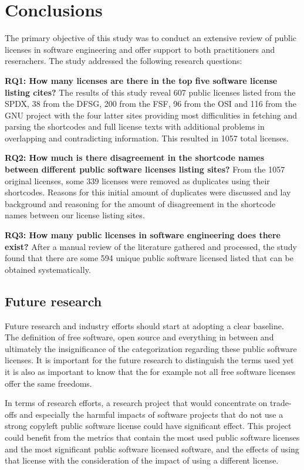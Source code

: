 \chapter{Conclusions\label{conclusions}}
The primary objective of this study was to conduct an extensive review of public licenses in software engineering and offer support to both practitioners and reserachers. The study addressed the following research questions:

\textbf{RQ1: How many licenses are there in the top five software license listing cites?} The results of this study reveal 607 public licenses listed from the SPDX, 38 from the DFSG, 200 from the FSF, 96 from the OSI and 116 from the GNU project with the four latter sites providing most difficulities in fetching and parsing the shortcodes and full license texts with additional problems in overlapping and contradicting information. This resulted in 1057 total licenses.

\textbf{RQ2: How much is there disagreement in the shortcode names between different public software licenses listing sites?} From the 1057 original licenses, some 339 licenses were removed as duplicates using their shortcodes. Reasons for this initial amount of duplicates were discussed and lay background and reasoning for the amount of disagreement in the shortcode names between our license listing sites.

\textbf{RQ3: How many public licenses in software engineering does there exist?} After a manual review of the literature gathered and processed, the study found that there are some 594 unique public software licensed listed that can be obtained systematically. 


\section{Future research}
Future research and industry efforts should start at adopting a clear baseline. The definition of free software, open source and everything in between and ultimately the insignificance of the categorization regarding these public software licenses. It is important for the future research to distinguish the terms used yet it is also as important to know that the for example not all free software licenses offer the same freedoms.

In terms of research efforts, a research project that would concentrate on trade-offs and especially the harmful impacts of software projects that do not use a strong copyleft public software license could have significant effect. This project could benefit from the metrics that contain the most used public software licenses and the most significant public software licensed software, and the effects of using that license with the consideration of the impact of using a different license. 

